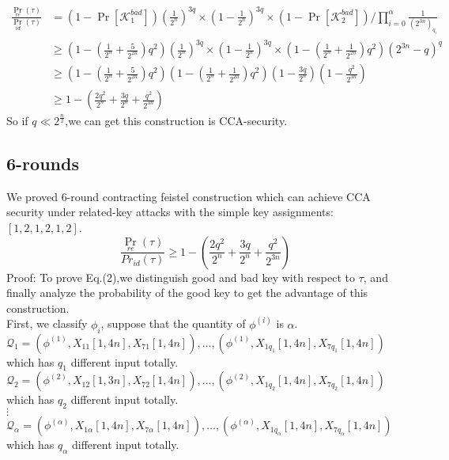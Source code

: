 \documentclass{article}
\begin{document}
\begin{align*}
\frac{\Pr_{re}(\tau)}{\Pr_{id}(\tau)}&= (1-\Pr[\mathcal{K}_{1}^{bad}])(\frac{1}{2^{n}})^{3q}\times(1-\frac{1}{2^{n}})^{3q}\times
(1-\Pr[\mathcal{K}_{2}^{bad}]) / \prod_{i=0}^{\alpha}\frac{1}{(2^{3n})_{q_{i}}}\\
&\geq (1-(\frac{1}{2^{n}}+\frac{5}{2^{2n}})q^{2})(\frac{1}{2^{n}})^{3q}\times(1-\frac{1}{2^{n}})^{3q}\times
(1-(\frac{1}{2^{n}}+\frac{1}{2^{2n}})q^{2})(2^{3n}-q)^{q}\\
&\geq(1-(\frac{1}{2^{n}}+\frac{5}{2^{2n}})q^{2})(1-(\frac{1}{2^{n}}+\frac{1}{2^{2n}})q^{2})(1-\frac{3q}{2^{n}})(1-\frac{q^{2}}{2^{3n}})\\
&\geq 1-( \frac{2q^{2}}{2^{n}}+\frac{3q}{2^{n}} +\frac{q^{2}}{2^{3n}})
\end{align*}
So if $q \ll 2^{\frac{n}{2}}$,we can get this construction is CCA-security.


\subsection{6-rounds}
We proved 6-round contracting feistel construction which can achieve CCA security under related-key attacks with the simple key assignments:$[1,2,1,2,1,2]$.\\
\begin{equation}
\frac{\Pr_{re}(\tau)}{Pr_{id}(\tau)}\geq 1-( \frac{2q^{2}}{2^{n}}+\frac{3q}{2^{n}} +\frac{q^{2}}{2^{3n}})
\end{equation}
Proof:
To prove Eq.(2),we distinguish good and bad key with respect to $\tau$, and finally analyze the probability of the good key to get the advantage of this construction.\\

First, we classify $\phi_{i}$, suppose that the quantity of $\phi^{(i)}$ is $\alpha$.\\
$\mathcal{Q}_{1}={(\phi^{(1)},X_{11}[1,4n],X_{71}[1,4n]),\dots,(\phi^{(1)},X_{1q_{1}}[1,4n],X_{7q_{1}}[1,4n])}$ which has $q_{1}$ different input totally.\\
$\mathcal{Q}_{2}={(\phi^{(2)},X_{12}[1,3n],X_{72}[1,4n]),\dots,(\phi^{(2)},X_{1q_{2}}[1,4n],X_{7q_{2}}[1,4n])}$    which has $q_{2}$ different input totally.\\
\quad \quad $\vdots$ \\
$\mathcal{Q}_{\alpha}={(\phi^{(\alpha)},X_{1\alpha}[1,4n],X_{7\alpha}[1,4n]),\dots,(\phi^{(\alpha)},X_{1q_{\alpha}}[1,4n],X_{7q_{\alpha}}[1,4n])}$ which has $q_{\alpha}$ different input totally.\\
\end{document}
